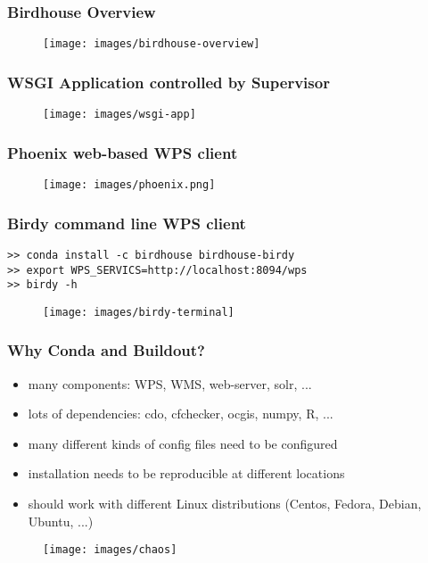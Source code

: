 \documentclass{beamer}
\begin{document}
\begin{frame}
\frametitle<presentation>{Birdhouse Overview}

  \begin{figure}[ht]
    \centering
    \texttt{[image: images/birdhouse-overview]}
  \end{figure}

\end{frame}

\begin{frame}
\frametitle<presentation>{WSGI Application controlled by Supervisor}

  \begin{figure}[ht]
    \centering
    \texttt{[image: images/wsgi-app]}
  \end{figure}

\end{frame}

\begin{frame}
  \frametitle<presentation>{Phoenix web-based WPS client}
  \begin{figure}
    \texttt{[image: images/phoenix.png]}
  \end{figure}
\end{frame}

\begin{frame}[fragile]
  \frametitle<presentation>{Birdy command line WPS client}
  \begin{verbatim}
>> conda install -c birdhouse birdhouse-birdy
>> export WPS_SERVICS=http://localhost:8094/wps
>> birdy -h
  \end{verbatim}
  \begin{figure}
    \texttt{[image: images/birdy-terminal]}
  \end{figure}
\end{frame}

\begin{frame}
  \frametitle<presentation>{Why Conda and Buildout?}
  \begin{itemize}
    \item many components: WPS, WMS, web-server, solr, ...
    \item lots of dependencies: cdo, cfchecker, ocgis, numpy, R, ...
    \item many different kinds of config files need to be configured
    \item installation needs to be reproducible at different locations
    \item should work with different Linux distributions (Centos, Fedora, Debian, Ubuntu, ...)
  \end{itemize}
  \begin{figure}
    \texttt{[image: images/chaos]}
  \end{figure}
\end{frame}
\end{document}
